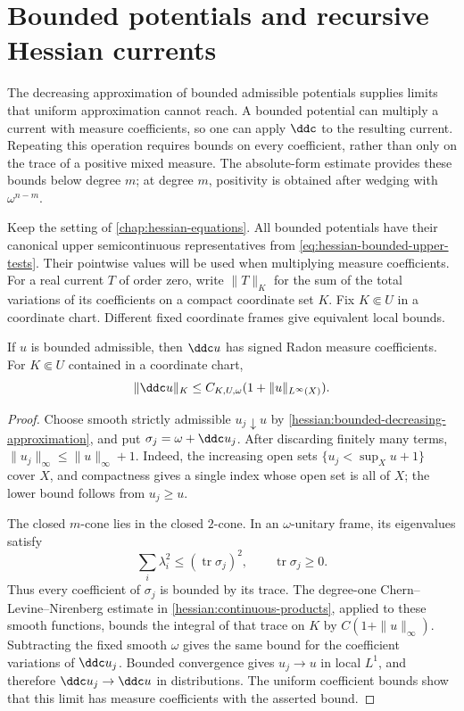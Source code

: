 \section{Bounded potentials and recursive Hessian currents}
\label{sec:hessian-bounded-currents}

The decreasing approximation of bounded admissible potentials supplies
limits that uniform approximation cannot reach. A bounded potential can
multiply a current with measure coefficients, so one can apply $\ddc$
to the resulting current. Repeating this operation requires bounds on
every coefficient, rather than only on the trace of a positive mixed
measure. The absolute-form estimate provides these bounds below degree
$m$; at degree $m$, positivity is obtained after wedging with
$\omega^{n-m}$.

Keep the setting of \cref{chap:hessian-equations}. All bounded potentials
have their canonical upper semicontinuous representatives from
\eqref{eq:hessian-bounded-upper-tests}. Their pointwise values will be
used when multiplying measure coefficients. For a real current $T$ of
order zero, write $\|T\|_K$ for the sum of the total variations of its
coefficients on a compact coordinate set $K$. Fix $K\Subset U$ in a
coordinate chart. Different fixed coordinate frames give equivalent
local bounds.

\begin{lemma}\label{hessian:bounded-zero-order}
If $u$ is bounded admissible, then $\ddc u$ has signed Radon measure
coefficients. For $K\Subset U$ contained in a coordinate chart,
\[
 \|\ddc u\|_K\leq C_{K,U,\omega}(1+\|u\|_{L^\infty(X)}).
\]
\end{lemma}
\begin{proof}
Choose smooth strictly admissible $u_j\downarrow u$ by
\cref{hessian:bounded-decreasing-approximation}, and put
$\sigma_j=\omega+\ddc u_j$. After discarding finitely many terms,
$\|u_j\|_\infty\leq\|u\|_\infty+1$. Indeed, the increasing open sets
$\{u_j<\sup_Xu+1\}$ cover $X$, and compactness gives a single index
whose open set is all of $X$; the lower bound follows from $u_j\geq u$.

The closed $m$-cone lies in the closed $2$-cone. In an $\omega$-unitary
frame, its eigenvalues satisfy
\[
 \sum_i\lambda_i^2\leq(\operatorname{tr}\sigma_j)^2,
 \qquad \operatorname{tr}\sigma_j\geq0.
\]
Thus every coefficient of $\sigma_j$ is bounded by its trace. The
degree-one Chern--Levine--Nirenberg estimate in
\cref{hessian:continuous-products}, applied to these smooth functions,
bounds the integral of that trace on $K$ by
$C(1+\|u\|_\infty)$. Subtracting the fixed smooth $\omega$ gives the
same bound for the coefficient variations of $\ddc u_j$.
Bounded convergence gives $u_j\to u$ in local $L^1$, and therefore
$\ddc u_j\to\ddc u$ in distributions. The uniform coefficient bounds
show that this limit has measure coefficients with the asserted bound.
\end{proof}

